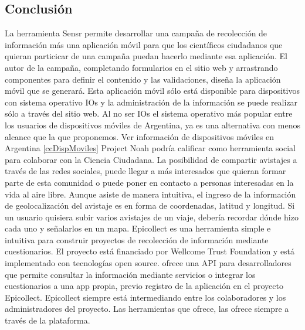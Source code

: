 \subsection{Conclusión}
La herramienta Sensr permite desarrollar una campaña de recolección de información más una aplicación móvil para que los científicos ciudadanos que quieran particicar de una campaña puedan hacerlo mediante esa aplicación. El autor de la campaña, completando formularios en el sitio web y arrastrando componentes para definir el contenido y las validaciones, diseña la aplicación móvil que se generará. Esta aplicación móvil sólo está disponible para dispositivos con sistema operativo IOs y la administración de la información se puede realizar sólo a través del sitio web. Al no ser IOs el sistema operativo más popular entre los usuarios de dispositivos móviles de Argentina, ya es una alternativa con menos alcance que la que proponemos. Ver información de dispositivos móviles en Argentina \ref{ccDispMoviles}
Project Noah podría calificar como herramienta social para colaborar con la Ciencia Ciudadana. La posibilidad de compartir avistajes a través de las redes sociales, puede llegar a más interesados que quieran formar parte de esta comunidad o puede poner en contacto a personas interesadas en la vida al aire libre.
Aunque asiste de manera intuitiva, el ingreso de la información de geolocalización del avistaje es en forma de coordenadas, latitud y longitud. Si un usuario quisiera subir varios avistajes de un viaje, debería recordar dónde hizo cada uno y señalarlos en un mapa.
Epicollect es una herramienta simple e intuitiva para construir proyectos de recolección de información mediante cuestionarios. El proyecto está financiado por Wellcome Trust Foundation y está implementado con tecnologías open source. ofrece una API para desarrolladores que permite consultar la información mediante servicios o integrar los cuestionarios a una app propia, previo registro de la aplicación en el proyecto Epicollect. Epicollect siempre está intermediando entre los colaboradores y los administradores del proyecto. Las herramientas que ofrece, las ofrece siempre a través de la plataforma. 



